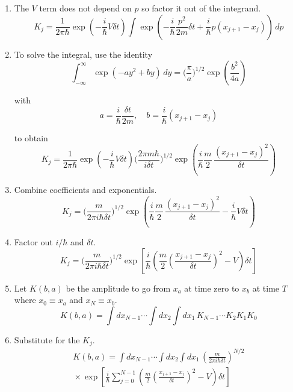 \documentclass[12pt]{article}
\begin{document}
\begin{enumerate}
\item
The $V$ term does not depend on $p$ so factor it out of the integrand.
\begin{equation*}
K_j=\frac{1}{2\pi\hbar}
\exp\left(-\frac{i}{\hbar}V\delta t\right)
\int\exp\left(-\frac{i}{\hbar}
\frac{p^2}{2m}
\delta t
+\frac{i}{\hbar}p(x_{j+1}-x_j)\right)
\,dp
\end{equation*}

\item
To solve the integral, use the identity
\begin{equation*}
\int_{-\infty}^\infty\exp(-ay^2+by)\,dy=\biggl(\frac{\pi}{a}\biggr)^{1/2}
\exp\left(\frac{b^2}{4a}\right)
\end{equation*}

with
\begin{equation*}
a=\frac{i}{\hbar}\frac{\delta t}{2m},\quad b=\frac{i}{\hbar}(x_{j+1}-x_j)
\end{equation*}

to obtain
\begin{equation*}
K_j=\frac{1}{2\pi\hbar}
\exp\left(-\frac{i}{\hbar}V\delta t\right)
\biggl(\frac{2\pi m\hbar}{i\delta t}\biggr)^{1/2}
\exp\left(\frac{i}{\hbar}\frac{m}{2}\,\frac{(x_{j+1}-x_j)^2}{\delta t}\right)
\end{equation*}

\item
Combine coefficients and exponentials.
\begin{equation*}
K_j=\biggl(\frac{m}{2\pi i\hbar\delta t}\biggr)^{1/2}
\exp\left(\frac{i}{\hbar}\frac{m}{2}\,\frac{(x_{j+1}-x_j)^2}{\delta t}-\frac{i}{\hbar}V\delta t\right)
\end{equation*}

\item
Factor out $i/\hbar$ and $\delta t$.
\begin{equation*}
K_j=\biggl(\frac{m}{2\pi i\hbar\delta t}\biggr)^{1/2}
\exp\left[\frac{i}{\hbar}
\left(\frac{m}{2}\left(\frac{x_{j+1}-x_j}{\delta t}\right)^2-V\right)\delta t
\right]
\end{equation*}

\item
Let $K(b,a)$ be the amplitude to go from $x_a$ at time zero to
$x_b$ at time $T$ where $x_0\equiv x_a$ and $x_N\equiv x_b$.
\begin{equation*}
K(b,a)=\int dx_{N-1}\cdots\int dx_2\int dx_1\,
K_{N-1}\cdots K_2K_1K_0
\end{equation*}

\item
Substitute for the $K_j$.
\begin{multline*}
K(b,a)=\int dx_{N-1}\cdots\int dx_2\int dx_1\,
\left(\frac{m}{2\pi i\hbar\delta t}\right)^{N/2}
\\
{}\times
\exp\left[
\frac{i}{\hbar}\sum_{j=0}^{N-1}\left(
\frac{m}{2}\left(\frac{x_{j+1}-x_j}{\delta t}\right)^2
-V\right)\delta t
\right]
\end{multline*}


\end{enumerate}
\end{document}
